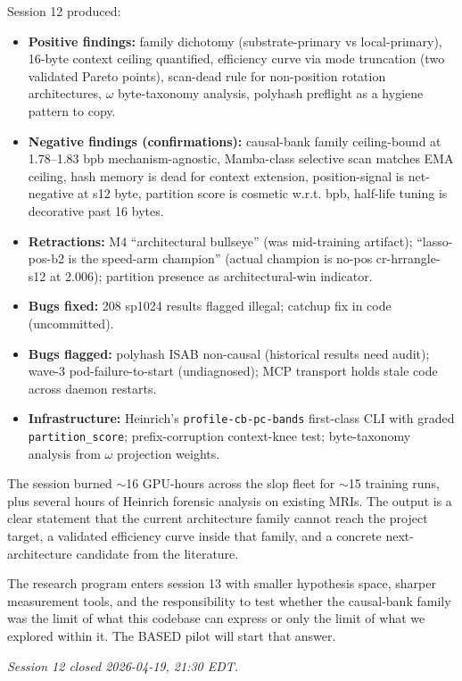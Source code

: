 Session 12 produced:
\begin{itemize}
  \item \textbf{Positive findings:} family dichotomy (substrate-primary vs local-primary), 16-byte context ceiling quantified, efficiency curve via mode truncation (two validated Pareto points), scan-dead rule for non-position rotation architectures, $\omega$ byte-taxonomy analysis, polyhash preflight as a hygiene pattern to copy.
  \item \textbf{Negative findings (confirmations):} causal-bank family ceiling-bound at 1.78--1.83 bpb mechanism-agnostic, Mamba-class selective scan matches EMA ceiling, hash memory is dead for context extension, position-signal is net-negative at s12 byte, partition score is cosmetic w.r.t. bpb, half-life tuning is decorative past 16 bytes.
  \item \textbf{Retractions:} M4 ``architectural bullseye'' (was mid-training artifact); ``lasso-pos-b2 is the speed-arm champion'' (actual champion is no-pos cr-hrrangle-s12 at 2.006); partition presence as architectural-win indicator.
  \item \textbf{Bugs fixed:} 208 sp1024 results flagged illegal; catchup fix in code (uncommitted).
  \item \textbf{Bugs flagged:} polyhash ISAB non-causal (historical results need audit); wave-3 pod-failure-to-start (undiagnosed); MCP transport holds stale code across daemon restarts.
  \item \textbf{Infrastructure:} Heinrich's \texttt{profile-cb-pc-bands} first-class CLI with graded \texttt{partition\_score}; prefix-corruption context-knee test; byte-taxonomy analysis from $\omega$ projection weights.
\end{itemize}

The session burned $\sim$16 GPU-hours across the slop fleet for $\sim$15 training runs, plus several hours of Heinrich forensic analysis on existing MRIs. The output is a clear statement that the current architecture family cannot reach the project target, a validated efficiency curve inside that family, and a concrete next-architecture candidate from the literature.

The research program enters session 13 with smaller hypothesis space, sharper measurement tools, and the responsibility to test whether the causal-bank family was the limit of what this codebase can express or only the limit of what we explored within it. The BASED pilot will start that answer.

\medskip
\noindent\emph{Session 12 closed 2026-04-19, 21:30 EDT.}
